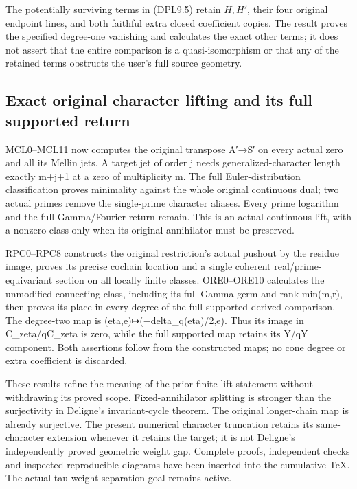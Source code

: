The potentially surviving terms in (DPL9.5) retain \(H,H'\), their four
original endpoint lines, and both faithful extra closed coefficient
copies. The result proves the specified degree-one vanishing and
calculates the exact other terms; it does not assert that the entire
comparison is a quasi-isomorphism or that any of the retained terms
obstructs the user's full source geometry.

\subsection{Exact original character lifting and its full supported
return}\label{exact-original-character-lifting-and-its-full-supported-return-occurrence-2}

MCL0--MCL11 now computes the original transpose A′→S′ on every actual
zero and all its Mellin jets. A target jet of order j needs
generalized-character length exactly m+j+1 at a zero of multiplicity m.
The full Euler-distribution classification proves minimality against the
whole original continuous dual; two actual primes remove the
single-prime character aliases. Every prime logarithm and the full
Gamma/Fourier return remain. This is an actual continuous lift, with a
nonzero class only when its original annihilator must be preserved.

RPC0--RPC8 constructs the original restriction's actual pushout by the
residue image, proves its precise cochain location and a single coherent
real/prime-equivariant section on all locally finite classes.
ORE0--ORE10 calculates the unmodified connecting class, including its
full Gamma germ and rank min(m,r), then proves its place in every degree
of the full supported derived comparison. The degree-two map is
(eta,e)↦(−delta\_q(eta)/2,e). Thus its image in C\_zeta/qC\_zeta is
zero, while the full supported map retains its Y/qY component. Both
assertions follow from the constructed maps; no cone degree or extra
coefficient is discarded.

These results refine the meaning of the prior finite-lift statement
without withdrawing its proved scope. Fixed-annihilator splitting is
stronger than the surjectivity in Deligne's invariant-cycle theorem. The
original longer-chain map is already surjective. The present numerical
character truncation retains its same-character extension whenever it
retains the target; it is not Deligne's independently proved geometric
weight gap. Complete proofs, independent checks and inspected
reproducible diagrams have been inserted into the cumulative TeX. The
actual tau weight-separation goal remains active.
